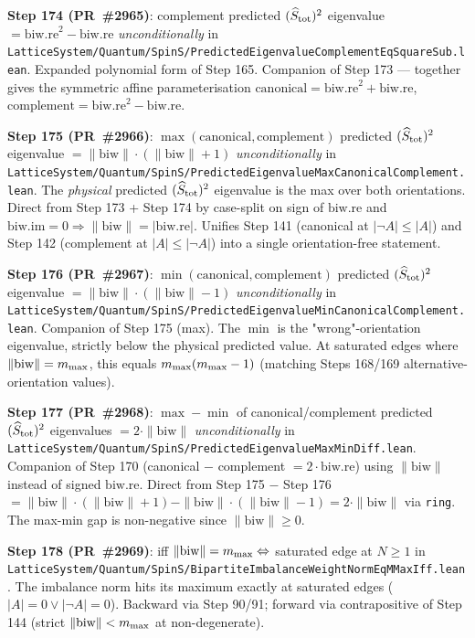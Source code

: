 \documentclass[a4paper,11pt]{article}
\begin{document}
\textbf{Step 174 (PR~\#2965)}: complement predicted $(\widehat S_{\rm tot})^2$
eigenvalue $= \mathrm{biw.re}^2 - \mathrm{biw.re}$ \emph{unconditionally}
in
\texttt{LatticeSystem/Quantum/SpinS/PredictedEigenvalueComplementEqSquareSub.lean}.
Expanded polynomial form of Step 165. Companion of Step 173 — together
gives the symmetric affine parameterisation
$\mathrm{canonical} = \mathrm{biw.re}^2 + \mathrm{biw.re}$,
$\mathrm{complement} = \mathrm{biw.re}^2 - \mathrm{biw.re}$.

\textbf{Step 175 (PR~\#2966)}: $\max(\mathrm{canonical}, \mathrm{complement})$
predicted $(\widehat S_{\rm tot})^2$ eigenvalue
$= \|\mathrm{biw}\|\cdot(\|\mathrm{biw}\|+1)$ \emph{unconditionally} in
\texttt{LatticeSystem/Quantum/SpinS/PredictedEigenvalueMaxCanonicalComplement.lean}.
The \emph{physical} predicted $(\widehat S_{\rm tot})^2$ eigenvalue is the
max over both orientations. Direct from Step 173 + Step 174 by case-split
on sign of $\mathrm{biw.re}$ and $\mathrm{biw.im} = 0 \Rightarrow
\|\mathrm{biw}\| = |\mathrm{biw.re}|$. Unifies Step 141 (canonical at
$|\neg A| \le |A|$) and Step 142 (complement at $|A| \le |\neg A|$) into a
single orientation-free statement.

\textbf{Step 176 (PR~\#2967)}: $\min(\mathrm{canonical}, \mathrm{complement})$
predicted $(\widehat S_{\rm tot})^2$ eigenvalue
$= \|\mathrm{biw}\|\cdot(\|\mathrm{biw}\|-1)$ \emph{unconditionally} in
\texttt{LatticeSystem/Quantum/SpinS/PredictedEigenvalueMinCanonicalComplement.lean}.
Companion of Step 175 (max). The $\min$ is the "wrong"-orientation
eigenvalue, strictly below the physical predicted value. At saturated
edges where $\|\mathrm{biw}\| = m_{\rm max}$, this equals
$m_{\rm max}(m_{\rm max}-1)$ (matching Steps 168/169
alternative-orientation values).

\textbf{Step 177 (PR~\#2968)}: $\max - \min$ of canonical/complement
predicted $(\widehat S_{\rm tot})^2$ eigenvalues $= 2\cdot\|\mathrm{biw}\|$
\emph{unconditionally} in
\texttt{LatticeSystem/Quantum/SpinS/PredictedEigenvalueMaxMinDiff.lean}.
Companion of Step 170 (canonical $-$ complement $= 2\cdot\mathrm{biw.re}$)
using $\|\mathrm{biw}\|$ instead of signed $\mathrm{biw.re}$. Direct
from Step 175 $-$ Step 176 $= \|\mathrm{biw}\|\cdot(\|\mathrm{biw}\|+1) -
\|\mathrm{biw}\|\cdot(\|\mathrm{biw}\|-1) = 2\cdot\|\mathrm{biw}\|$ via
\texttt{ring}. The max-min gap is non-negative since $\|\mathrm{biw}\| \ge 0$.

\textbf{Step 178 (PR~\#2969)}: iff $\|\mathrm{biw}\| = m_{\rm max}
\Leftrightarrow$ saturated edge at $N \ge 1$ in
\texttt{LatticeSystem/Quantum/SpinS/BipartiteImbalanceWeightNormEqMMaxIff.lean}.
The imbalance norm hits its maximum exactly at saturated edges
($|A| = 0 \vee |\neg A| = 0$). Backward via Step 90/91; forward via
contrapositive of Step 144 (strict $\|\mathrm{biw}\| < m_{\rm max}$ at
non-degenerate).
\end{document}
